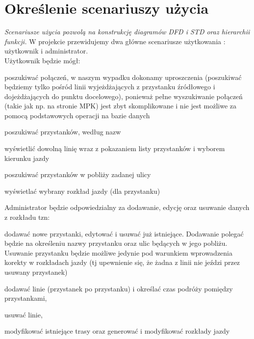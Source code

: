 \section{Określenie scenariuszy użycia}
\textit{Scenariusze użycia pozwolą na konstrukcję diagramów
DFD i STD oraz hierarchii funkcji.}
W projekcie przewidujemy dwa główne scenariusze użytkowania : użytkownik i administrator.\\
Użytkownik będzie mógł:
\begin{list}{*}{}
\item poszukiwać połączeń, w naszym wypadku dokonamy uproszczenia (poszukiwać będziemy tylko pośród linii wyjeżdżających z przystanku źródłowego i dojeżdżających do punktu docelowego), ponieważ pełne wyszukiwanie połączeń (takie jak np. na stronie MPK) 
jest zbyt skomplikowane i nie jest możliwe za pomocą podstawowych operacji na bazie danych
\item poszukiwać przystanków, według nazw
\item wyświetlić dowolną linię wraz z pokazaniem listy przystanków i wyborem kierunku jazdy
\item poszukiwać przystanków w pobliży zadanej ulicy
\item wyświetlać wybrany rozkład jazdy (dla przystanku)
\end{list}

Administrator będzie odpowiedzialny za dodawanie, edycję oraz usuwanie danych z rozkładu tzn:
\begin{list}{*}{}
\item dodawać nowe przystanki, edytować i usuwać już istniejące. Dodawanie polegać będzie na określeniu nazwy przystanku oraz ulic będących w jego pobliżu.
Usuwanie przystanku będzie możliwe jedynie pod warunkiem wprowadzenia korekty w rozkładach jazdy (tj upewnienie się, że żadna z linii nie
jeździ przez usuwany przystanek)
\item dodawać linie  (przystanek po przystanku) i określać czas podróży pomiędzy przystankami,
\item usuwać linie,
\item modyfikować istniejące trasy oraz generować i modyfikować rozkłady jazdy
\end{list}


